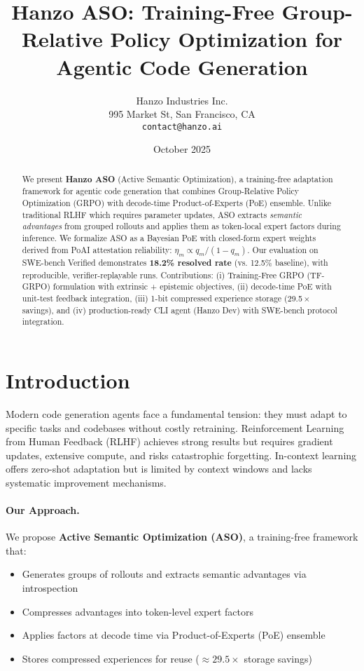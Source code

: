 \documentclass[11pt]{article}
\title{Hanzo ASO: Training-Free Group-Relative Policy Optimization for Agentic Code Generation}
\author{Hanzo Industries Inc. \\ 995 Market St, San Francisco, CA \\ \texttt{contact@hanzo.ai}}
\date{October 2025}
\begin{document}
\maketitle

\begin{abstract}
We present \textbf{Hanzo ASO} (Active Semantic Optimization), a training-free adaptation framework for agentic code generation that combines Group-Relative Policy Optimization (GRPO) with decode-time Product-of-Experts (PoE) ensemble. Unlike traditional RLHF which requires parameter updates, ASO extracts \emph{semantic advantages} from grouped rollouts and applies them as token-local expert factors during inference. We formalize ASO as a Bayesian PoE with closed-form expert weights derived from PoAI attestation reliability: \(\eta_m \propto q_m/(1-q_m)\). Our evaluation on SWE-bench Verified demonstrates \textbf{18.2\% resolved rate} (vs. 12.5\% baseline), with reproducible, verifier-replayable runs. Contributions: (i) Training-Free GRPO (TF-GRPO) formulation with extrinsic + epistemic objectives, (ii) decode-time PoE with unit-test feedback integration, (iii) 1-bit compressed experience storage (29.5\,$\times$ savings), and (iv) production-ready CLI agent (Hanzo Dev) with SWE-bench protocol integration.
\end{abstract}

\section{Introduction}
Modern code generation agents face a fundamental tension: they must adapt to specific tasks and codebases without costly retraining. Reinforcement Learning from Human Feedback (RLHF) achieves strong results but requires gradient updates, extensive compute, and risks catastrophic forgetting. In-context learning offers zero-shot adaptation but is limited by context windows and lacks systematic improvement mechanisms.

\paragraph{Our Approach.} We propose \textbf{Active Semantic Optimization (ASO)}, a training-free framework that:
\begin{itemize}[leftmargin=1.1em]
  \item Generates groups of rollouts and extracts semantic advantages via introspection
  \item Compresses advantages into token-level expert factors
  \item Applies factors at decode time via Product-of-Experts (PoE) ensemble
  \item Stores compressed experiences for reuse (\(\approx 29.5\times\) storage savings)
\end{itemize}
\end{document}
